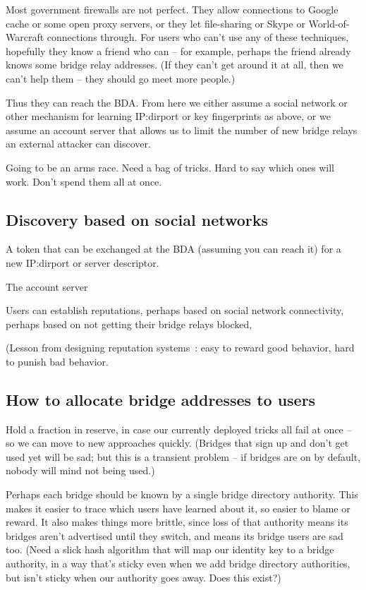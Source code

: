 \documentclass{llncs}
\begin{document}
Most government firewalls are not perfect. They allow connections to
Google cache or some open proxy servers, or they let file-sharing or
Skype or World-of-Warcraft connections through.
For users who can't use any of these techniques, hopefully they know
a friend who can -- for example, perhaps the friend already knows some
bridge relay addresses.
(If they can't get around it at all, then we can't help them -- they
should go meet more people.)

Thus they can reach the BDA. From here we either assume a social
network or other mechanism for learning IP:dirport or key fingerprints
as above, or we assume an account server that allows us to limit the
number of new bridge relays an external attacker can discover.

Going to be an arms race. Need a bag of tricks. Hard to say
which ones will work. Don't spend them all at once.

\subsection{Discovery based on social networks}

A token that can be exchanged at the BDA (assuming you
can reach it) for a new IP:dirport or server descriptor.

The account server

Users can establish reputations, perhaps based on social network
connectivity, perhaps based on not getting their bridge relays blocked,

(Lesson from designing reputation systems~\cite{p2p-econ}: easy to
reward good behavior, hard to punish bad behavior.

\subsection{How to allocate bridge addresses to users}

Hold a fraction in reserve, in case our currently deployed tricks
all fail at once -- so we can move to new approaches quickly.
(Bridges that sign up and don't get used yet will be sad; but this
is a transient problem -- if bridges are on by default, nobody will
mind not being used.)

Perhaps each bridge should be known by a single bridge directory
authority. This makes it easier to trace which users have learned about
it, so easier to blame or reward. It also makes things more brittle,
since loss of that authority means its bridges aren't advertised until
they switch, and means its bridge users are sad too.
(Need a slick hash algorithm that will map our identity key to a
bridge authority, in a way that's sticky even when we add bridge
directory authorities, but isn't sticky when our authority goes
away. Does this exist?)
\end{document}
